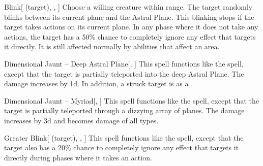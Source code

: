 \lowercase{\hypertarget{spell:Blink}{}}\label{spell:Blink}
\begin{attuneability}[\nth{4}]{\hypertarget{spell:Blink}{Blink}}[ (target), , ]
Choose a willing creature within \rngclose range.
The target randomly blinks between its current plane and the Astral Plane.
This blinking stops if the target takes actions on its current plane.
In any phase where it does not take any actions, the target has a 50\% chance to completely ignore any effect that targets it directly.
It is still affected normally by abilities that affect an area.
\end{attuneability}
\vspace{0.25em}



\lowercase{\hypertarget{spell:Dimensional Jaunt -- Deep Astral Plane}{}}\label{spell:Dimensional Jaunt -- Deep Astral Plane}
\begin{apability}[\nth{5}]{\hypertarget{spell:Dimensional Jaunt -- Deep Astral Plane}{Dimensional Jaunt -- Deep Astral Plane}}[, ]
This spell functions like the  spell, except that the target is partially teleported into the deep Astral Plane.
The damage increases by \plus1d.
In addition, a struck target is  as a .
\end{apability}
\vspace{0.25em}



\lowercase{\hypertarget{spell:Dimensional Jaunt -- Myriad}{}}\label{spell:Dimensional Jaunt -- Myriad}
\begin{apability}[\nth{6}]{\hypertarget{spell:Dimensional Jaunt -- Myriad}{Dimensional Jaunt -- Myriad}}[, ]
This spell functions like the  spell, except that the target is partially teleported through a dizzying array of planes.
The damage increases by \plus3d and becomes damage of all types.
\end{apability}
\vspace{0.25em}



\lowercase{\hypertarget{spell:Greater Blink}{}}\label{spell:Greater Blink}
\begin{attuneability}[\nth{7}]{\hypertarget{spell:Greater Blink}{Greater Blink}}[ (target), , ]
This spell functions like the  spell, except that the target also has a 20\% chance to completely ignore any effect that targets it directly during phases where it takes an action.
\end{attuneability}
\vspace{0.25em}



